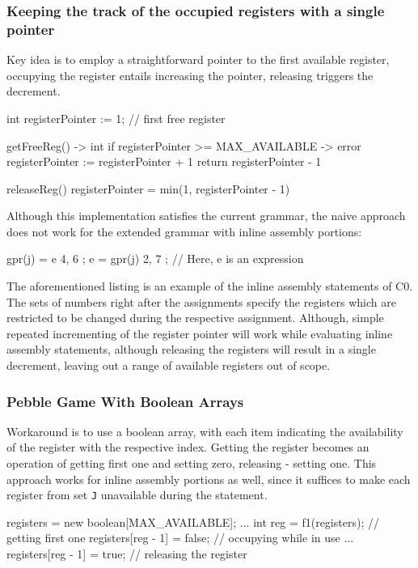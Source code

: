 \subsubsection{Keeping the track of the occupied registers with a single pointer}
Key idea is to employ a straightforward pointer to the first available register, occupying the register entails increasing the pointer,
releasing triggers the decrement.
\begin{codeblock}
int registerPointer := 1; // first free register

getFreeReg() -> int {
    if registerPointer >= MAX_AVAILABLE -> { error }
    registerPointer := registerPointer + 1
    return registerPointer - 1
}

releaseReg() {
    registerPointer = min(1, registerPointer - 1)
}
\end{codeblock}
Although this implementation satisfies the current grammar, the naive approach does not work for the extended grammar
with inline assembly portions:
\begin{codeblock}
gpr(j) = e { 4, 6 };
e = gpr(j) { 2, 7 };
// Here, e is an expression
\end{codeblock}

The aforementioned listing is an example of the inline assembly statements of C0. The sets of numbers right after the assignments
specify the registers which are restricted to be changed during the respective assignment. Although,
simple repeated incrementing of the register pointer will work while evaluating inline assembly statements, although releasing the
registers will result in a single decrement, leaving out a range of available registers out of scope.

\subsubsection{Pebble Game With Boolean Arrays}
Workaround is to use a boolean array, with each item indicating the availability of the register
with the respective index. Getting the register becomes an operation of getting first one and setting zero,
releasing - setting one. This approach works for inline assembly portions as well, since it suffices to make
each register from set \verb+J+ unavailable during the statement.
\begin{codeblock}
registers = new boolean[MAX_AVAILABLE];
...
int reg = f1(registers); // getting first one
registers[reg - 1] = false; // occupying while in use
...
registers[reg - 1] = true; // releasing the register
\end{codeblock}
